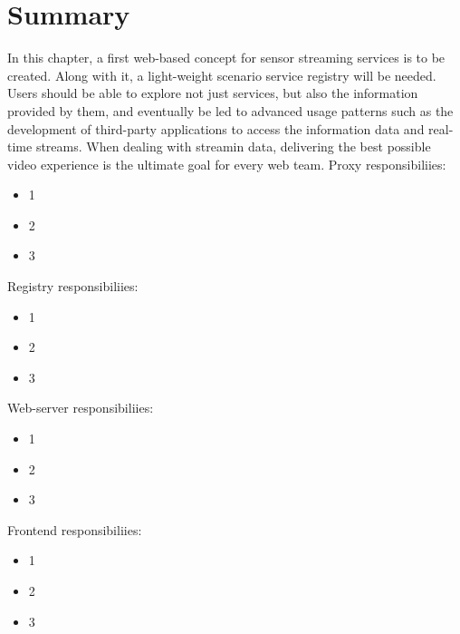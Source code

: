 \section{Summary}
	In this chapter, a first web-based concept for sensor streaming services is to be created. Along with it, a light-weight scenario service registry will be needed. Users should be able to explore not just services, but also the information provided by them, and eventually be led to advanced usage patterns such as the development of third-party applications to access the information data and real-time streams. When dealing with streamin data, delivering the best possible video experience is the ultimate goal for every web team. 
  \newline
  Proxy responsibiliies:
  \begin{itemize}
  \item 1
  \item 2
  \item 3
  \end{itemize}
  Registry responsibiliies:
  \begin{itemize}
  \item 1
  \item 2
  \item 3
  \end{itemize}
  Web-server responsibiliies:
  \begin{itemize}
  \item 1
  \item 2
  \item 3
  \end{itemize}
  Frontend responsibiliies:
  \begin{itemize}
  \item 1
  \item 2
  \item 3
  \end{itemize}